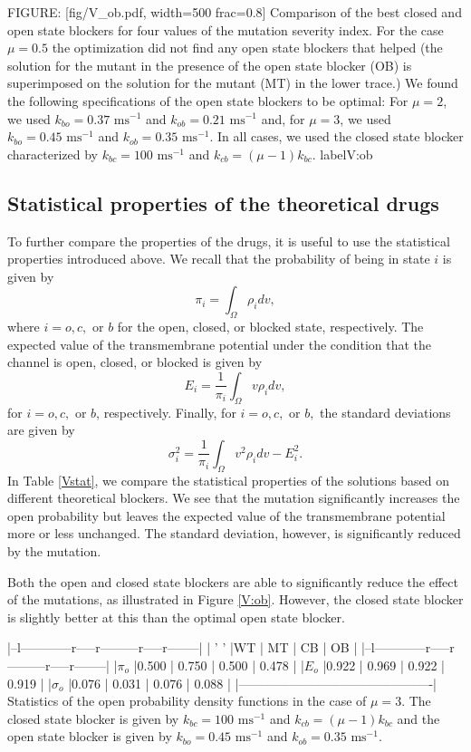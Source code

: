 FIGURE: [fig/V_ob.pdf, width=500 frac=0.8] Comparison of the best closed and open state blockers for four values of the mutation severity index.
For the case $\mu=0.5$ the optimization did not find any open state blockers that helped (the solution for the mutant in the presence of the open state blocker (OB) is superimposed on the solution for the mutant (MT) in the lower trace.) We found the following specifications of the open state blockers to be optimal: For $\mu=2$, we used 
 $k_{bo}=0.37\text{ ms}^{-1}$ and  $k_{ob}=0.21\text{ ms}^{-1}$  and, for  $\mu=3$, we used  $k_{bo}=0.45 \text{ ms}^{-1}$ and $k_{ob}=0.35\text{ ms}^{-1}$. In all cases, we used the closed state blocker characterized by $k_{bc}=100\text{ ms}^{-1}$ and $k_{cb}=\left(  \mu-1\right)  k_{bc}$.  label{V:ob}\bigskip

\subsection{Statistical properties of the theoretical drugs}
\label{statpropdrug}

To further compare the properties of the drugs, it is useful
to use the statistical properties introduced above. We recall that the
probability of being in state $i$ is given by
\[
\pi_{i}=\int_{\Omega}\rho_{i}dv,
\]
where $i=o,c,$ or $b$ for the open, closed, or blocked state, respectively. The expected value of the transmembrane
potential under the condition that the channel is open, closed, or blocked is
given by
\[
E_{i}=\frac{1}{\pi_{i}}\int_{\Omega}v\rho_{i}dv,
\]
for $i=o,c,$ or $b$, respectively. Finally, for $i=o,c,$ or $b,$ the standard
deviations are given by
\[
\sigma_{i}^{2}=\frac{1}{\pi_{i}}\int_{\Omega}v^{2}\rho_{i}dv-E_{i}^{2}.
\]
In Table \ref{Vstat}, we compare the statistical properties of the solutions based on
different theoretical blockers. We see that the mutation significantly increases the open probability but leaves the expected value of the transmembrane potential more or less unchanged. The standard deviation, however, is significantly reduced by the mutation.

Both the open and closed state blockers are able to significantly reduce the effect of the mutations, as illustrated in
Figure \ref{V:ob}. However, the closed state blocker is slightly better at this than the optimal open state blocker.

|--l------------r-----r---------r-----r--------|
| ' '       |WT    | MT    | CB    | OB        |
|--l------------r-----r---------r-----r--------|
|$\pi_o$    |0.500 | 0.750 | 0.500 | 0.478     |
|$E_o$      |0.922 | 0.969 | 0.922 | 0.919     |
|$\sigma_o$ |0.076 | 0.031 | 0.076 | 0.088     |
|----------------------------------------------|
Statistics of the open probability density functions in the case of $\mu=3$. The closed state blocker is given by
$k_{bc}=100\text{ ms}^{-1}$ and $k_{cb}=\left(  \mu-1\right)  k_{bc}$ and the open state blocker is given by $k_{bo}=0.45\text{ ms}^{-1}$ and $k_{ob}=0.35\text{ ms}^{-1}$.





